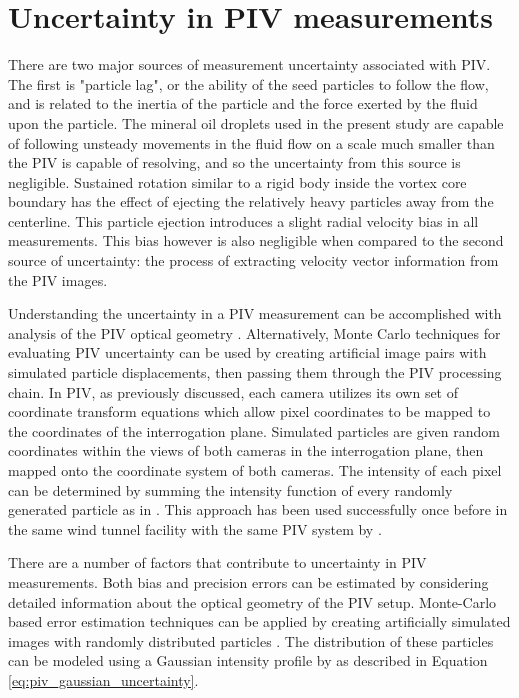 \section{Uncertainty in PIV measurements}
\label{sec:piv_uncert}

 There are two major sources of measurement uncertainty associated with PIV. 
 The first is "particle lag", or the ability of the seed particles to follow 
 the 
 flow, and is related to the inertia of the particle and the force exerted by 
 the fluid upon the particle. The mineral oil droplets used in the present 
 study are capable of following unsteady movements in the fluid flow on a scale 
 much smaller than the PIV is capable of resolving, and so the uncertainty from 
 this source is negligible. Sustained rotation similar to a rigid body 
 inside the vortex core boundary has the effect of ejecting the relatively 
 heavy particles away from the centerline. This particle ejection introduces a 
 slight radial velocity bias in all measurements. This bias however is also 
 negligible when compared to the second source of uncertainty: the process of 
 extracting velocity vector information from the PIV images.
 
 Understanding the uncertainty in a PIV measurement can be accomplished with 
 analysis of the PIV optical geometry \cite{lawson1997b}. Alternatively, Monte 
 Carlo techniques for evaluating PIV uncertainty can be used by creating 
 artificial image pairs with simulated particle displacements, then passing 
 them through the PIV processing chain. In PIV, as previously discussed, each 
 camera 
 utilizes its own set of coordinate transform equations which allow pixel 
 coordinates to be mapped to the coordinates of the interrogation plane. 
 Simulated particles are given random coordinates within the views of both 
 cameras in the interrogation plane, then mapped onto the coordinate system of 
 both cameras. The intensity of each pixel can be determined by summing the 
 intensity function of every randomly generated particle as in 
 \cite{adeyinka2005,fouras2007}. This approach has been used successfully once 
 before in the same wind tunnel facility with the same PIV system by 
 \cite{doan2012}.
 
There are a number of factors that contribute to uncertainty in PIV 
measurements. Both bias and precision errors can be estimated by considering 
detailed information about the optical geometry of the PIV setup. Monte-Carlo 
based error estimation techniques can be applied by creating artificially 
simulated images with randomly distributed particles \cite{adeyinka2005}. 
The distribution of these particles can be modeled using a Gaussian intensity  
profile by \cite{raffel1998} as described in Equation 
\ref{eq:piv_gaussian_uncertainty}.

